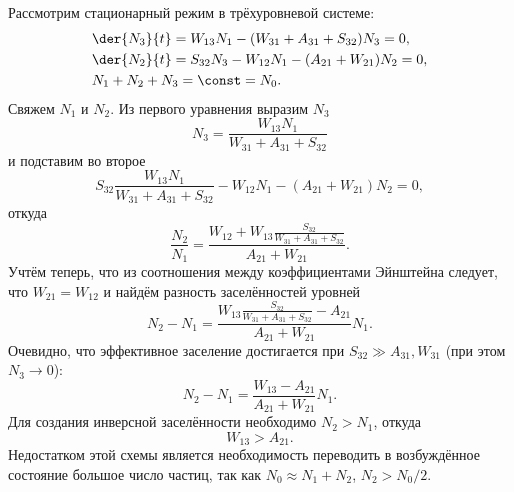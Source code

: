 Рассмотрим стационарный режим в трёхуровневой системе:
\begin{align*}
    & \der{N_3}{t} = W_{13}N_1 - (W_{31} + A_{31} + S_{32}) N_3 = 0,\\
    & \der{N_2}{t} = S_{32}N_3 - W_{12}N_1 - (A_{21} + W_{21}) N_2 = 0,\\
    & N_1 + N_2 + N_3 = \const = N_0.
\end{align*}
Свяжем \( N_1 \) и \( N_2 \). Из первого уравнения выразим \( N_3 \)
\[
    N_3 = \frac{W_{13}N_1}{W_{31} + A_{31} + S_{32}}
\]
и подставим во второе
\[
    S_{32}\frac{W_{13}N_1}{W_{31} + A_{31} + S_{32}} - W_{12}N_1 -
    (A_{21} + W_{21}) N_2 = 0,
\]
откуда
\[
    \frac{N_2}{N_1} =
        \frac{W_{12} + W_{13}\frac{S_{32}}{W_{31} + A_{31} + S_{32}}}
        {A_{21} + W_{21}}.
\]
Учтём теперь, что из соотношения между коэффициентами Эйнштейна следует, что
\( W_{21} = W_{12} \) и найдём разность заселённостей уровней
\[
    N_2 - N_1 = 
        \frac{W_{13}\frac{S_{32}}{W_{31} + A_{31} + S_{32}} - A_{21}}
        {A_{21} + W_{21}}N_1.
\]
Очевидно, что эффективное заселение достигается при
\( S_{32} \gg A_{31}, W_{31} \) (при этом \( N_3 \to 0 \)):
\[
    N_2 - N_1 = 
        \frac{W_{13} - A_{21}}{A_{21} + W_{21}}N_1.
\]
Для создания инверсной заселённости необходимо \( N_2 > N_1 \), откуда
\[
    W_{13} > A_{21}.
\]
Недостатком этой схемы является необходимость переводить в возбуждённое
состояние большое число частиц, так как \( N_0 \approx N_1 + N_2 \),
\( N_2 > N_0/2 \).

